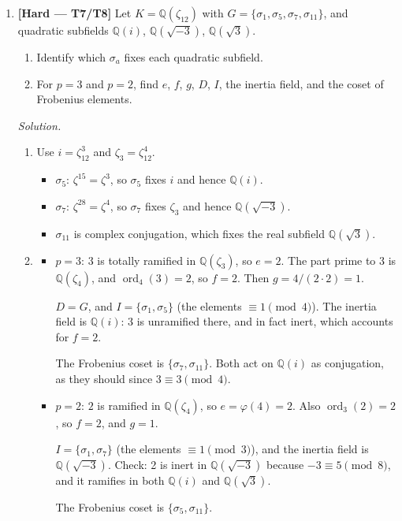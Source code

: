 \documentclass[11pt]{article}
\newcommand{\Q}{\mathbb{Q}}
\DeclareMathOperator{\ord}{ord}
\begin{document}
\begin{enumerate}[label=\textbf{B\arabic*.}]
\begin{itemize}
    So $K^D=\Q(\zeta+\bar\zeta)=\Q(\sqrt2)$. Check: $7=(3+\sqrt2)(3-\sqrt2)$ splits in $\Q(\sqrt2)$.
    \item $p=2$: $\Phi_8=x^4+1\equiv(x+1)^4\pmod2$, so 2 is totally ramified with $e=4$. Then $D=I=G$, the decomposition field is $\Q$, and the Frobenius is only defined as the coset $I=G$.
  \end{itemize}

  \item \textbf{[Hard --- T7/T8]} Let $K=\Q(\zeta_{12})$ with $G=\{\sigma_1,\sigma_5,\sigma_7,\sigma_{11}\}$, and quadratic subfields $\Q(i)$, $\Q(\sqrt{-3})$, $\Q(\sqrt3)$.
  \begin{enumerate}[label=(\alph*)]
    \item Identify which $\sigma_a$ fixes each quadratic subfield.
    \item For $p=3$ and $p=2$, find $e$, $f$, $g$, $D$, $I$, the inertia field, and the coset of Frobenius elements.
  \end{enumerate}

  \textit{Solution.}
  \begin{enumerate}[label=(\alph*)]
    \item Use $i=\zeta_{12}^3$ and $\zeta_3=\zeta_{12}^4$.
    \begin{itemize}
      \item $\sigma_5$: $\zeta^{15}=\zeta^3$, so $\sigma_5$ fixes $i$ and hence $\Q(i)$.
      \item $\sigma_7$: $\zeta^{28}=\zeta^4$, so $\sigma_7$ fixes $\zeta_3$ and hence $\Q(\sqrt{-3})$.
      \item $\sigma_{11}$ is complex conjugation, which fixes the real subfield $\Q(\sqrt3)$.
    \end{itemize}
    \item \begin{itemize}
      \item $p=3$: $3$ is totally ramified in $\Q(\zeta_3)$, so $e=2$. The part prime to 3 is $\Q(\zeta_4)$, and $\ord_4(3)=2$, so $f=2$. Then $g=4/(2\cdot2)=1$.

      $D=G$, and $I=\{\sigma_1,\sigma_5\}$ (the elements $\equiv1\pmod4$). The inertia field is $\Q(i)$: 3 is unramified there, and in fact inert, which accounts for $f=2$.

      The Frobenius coset is $\{\sigma_7,\sigma_{11}\}$. Both act on $\Q(i)$ as conjugation, as they should since $3\equiv3\pmod4$.
      \item $p=2$: $2$ is ramified in $\Q(\zeta_4)$, so $e=\varphi(4)=2$. Also $\ord_3(2)=2$, so $f=2$, and $g=1$.

      $I=\{\sigma_1,\sigma_7\}$ (the elements $\equiv1\pmod3$), and the inertia field is $\Q(\sqrt{-3})$. Check: 2 is inert in $\Q(\sqrt{-3})$ because $-3\equiv5\pmod 8$, and it ramifies in both $\Q(i)$ and $\Q(\sqrt3)$.

      The Frobenius coset is $\{\sigma_5,\sigma_{11}\}$.
    \end{itemize}
  \end{enumerate}
\end{enumerate}
\end{document}
